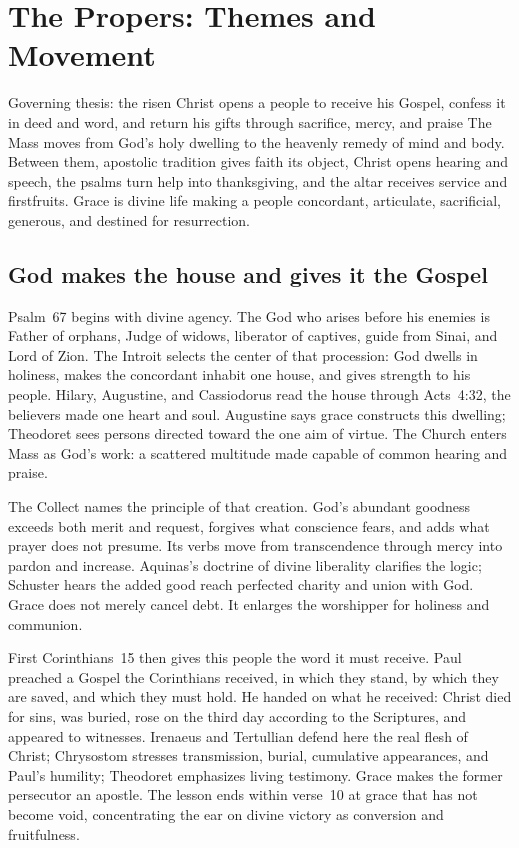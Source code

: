 \section*{The Propers: Themes and Movement}
\label{triptych:brief-synthesis:start}

\begingroup\footnotesize
\setlength{\parskip}{0.28em}

\begin{massbox}{Governing thesis: the risen Christ opens a people to receive his Gospel, confess it in deed and word, and return his gifts through sacrifice, mercy, and praise}
The Mass moves from God's holy dwelling to the heavenly remedy of mind and
body. Between them, apostolic tradition gives faith its object, Christ opens
hearing and speech, the psalms turn help into thanksgiving, and the altar
receives service and firstfruits. Grace is divine life making a people
concordant, articulate, sacrificial, generous, and destined for resurrection.
\end{massbox}

\subsection*{God makes the house and gives it the Gospel}

Psalm~67 begins with divine agency. The God who arises before his enemies is
Father of orphans, Judge of widows, liberator of captives, guide from Sinai,
and Lord of Zion. The Introit selects the center of that procession: God dwells
in holiness, makes the concordant inhabit one house, and gives strength to his
people. Hilary, Augustine, and Cassiodorus read the house through Acts~4:32,
the believers made one heart and soul. Augustine says grace constructs this
dwelling; Theodoret sees persons directed toward the one aim of virtue. The
Church enters Mass as God's work: a scattered multitude made capable of common
hearing and praise.

The Collect names the principle of that creation. God's abundant goodness
exceeds both merit and request, forgives what conscience fears, and adds what
prayer does not presume. Its verbs move from transcendence through mercy into
pardon and increase. Aquinas's doctrine of divine liberality clarifies the
logic; Schuster hears the added good reach perfected charity and union with
God. Grace does not merely cancel debt. It enlarges the worshipper for holiness
and communion.

First Corinthians~15 then gives this people the word it must receive. Paul
preached a Gospel the Corinthians received, in which they stand, by which they
are saved, and which they must hold. He handed on what he received: Christ died
for sins, was buried, rose on the third day according to the Scriptures, and
appeared to witnesses. Irenaeus and Tertullian defend here the real flesh of
Christ; Chrysostom stresses transmission, burial, cumulative appearances, and
Paul's humility; Theodoret emphasizes living testimony. Grace makes the former
persecutor an apostle. The lesson ends within verse~10 at grace that has not
become void, concentrating the ear on divine victory as conversion and
fruitfulness.

